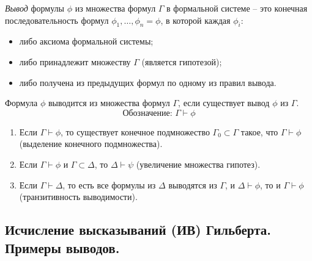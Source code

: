 \begin{definition}[Вывод]
    \emph{Вывод} формулы $\phi$ из множества формул $\Gamma$ в формальной системе -- это конечная последовательность формул $\phi_1,\ldots,\phi_n = \phi$, в которой каждая $\phi_i$:
    \begin{itemize}
        \item либо аксиома формальной системы;
        \item либо принадлежит множеству $\Gamma$ (является гипотезой);
        \item либо получена из предыдущих формул по одному из правил вывода.
    \end{itemize}
\end{definition}

\begin{definition}[Выводимость]
    Формула $\phi$ выводится из множества формул $\Gamma$, если существует вывод $\phi$ из $\Gamma$.
    \[
        \text{Обозначение: }\Gamma\vdash\phi
    \]
\end{definition}

\begin{statement}\leavevmode
    \begin{enumerate}
        \item Если $\Gamma\vdash\phi$, то существует конечное подмножество $\Gamma_0 \subset \Gamma$ такое, что $\Gamma \vdash\phi$ (выделение конечного подмножества).
        \item Если $\Gamma\vdash\phi$ и $\Gamma\subset\Delta$, то $\Delta\vdash\psi$ (увеличение множества гипотез).
        \item Если $\Gamma\vdash\Delta$, то есть все формулы из $\Delta$ выводятся из $\Gamma$, и $\Delta\vdash\phi$, то и $\Gamma\vdash\phi$ (транзитивность выводимости).
    \end{enumerate}
\end{statement}

\subsection{Исчисление высказываний (ИВ) Гильберта. Примеры выводов.}


